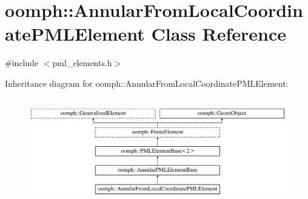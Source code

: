 \hypertarget{classoomph_1_1AnnularFromLocalCoordinatePMLElement}{}\section{oomph\+:\+:Annular\+From\+Local\+Coordinate\+P\+M\+L\+Element Class Reference}
\label{classoomph_1_1AnnularFromLocalCoordinatePMLElement}


{\ttfamily \#include $<$pml\+\_\+elements.\+h$>$}

Inheritance diagram for oomph\+:\+:Annular\+From\+Local\+Coordinate\+P\+M\+L\+Element\+:\begin{figure}[H]
\begin{center}
\leavevmode
\includegraphics[height=4.666667cm]{classoomph_1_1AnnularFromLocalCoordinatePMLElement}
\end{center}
\end{figure}
